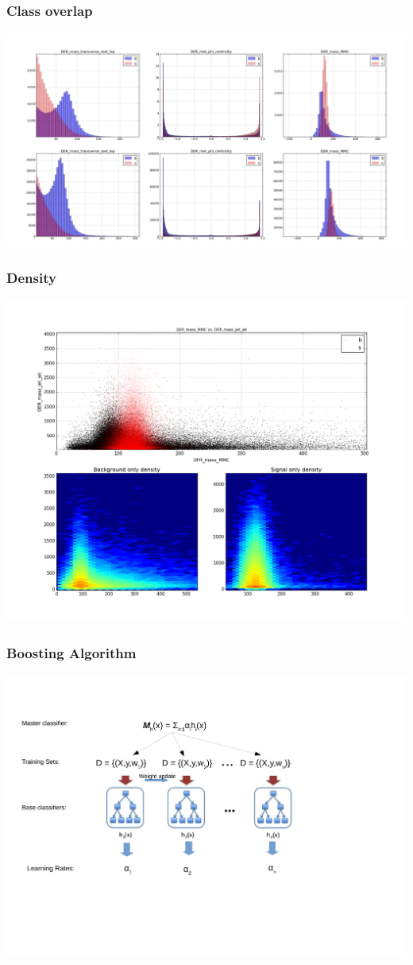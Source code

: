 \documentclass[pdf]{beamer}
\begin{document}
\begin{frame}
\frametitle{Class overlap}
\hspace*{-9mm}
\includegraphics[scale=0.2]{top_hist.png}
\end{frame}

\begin{frame}
\frametitle{Density}
\includegraphics[scale=0.27]{density.png}
\end{frame}

\begin{frame}
\frametitle{Boosting Algorithm}
\includegraphics[scale=0.5]{boosting.pdf}
\end{frame}
\end{document}
